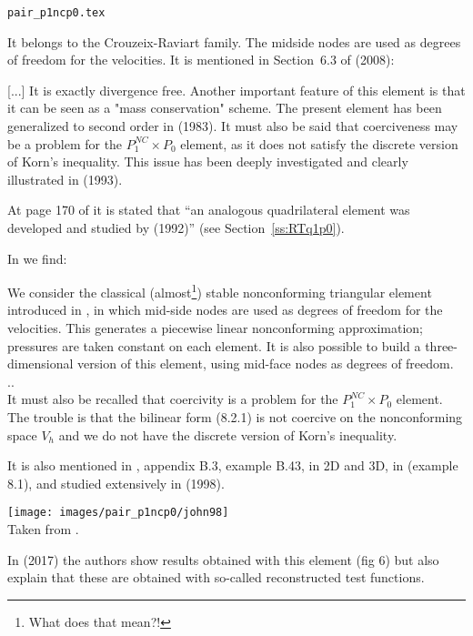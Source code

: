 \begin{flushright} {\tiny {\color{gray} \tt pair\_p1ncp0.tex}} \end{flushright}

It belongs to the Crouzeix-Raviart family. 
The midside nodes are used as degrees of freedom for the velocities.
It is mentioned in Section~6.3 of \textcite{bobf08} (2008): 
\begin{displayquote}
{\color{darkgray}
[...]
It is exactly divergence free. Another important feature of this
element is that it can be seen as a "mass conservation" scheme. The present element
has been generalized to second order in \textcite{foso83} (1983).
It must also be said that coerciveness may be a problem for the $P_1^{NC} \times P_0$ 
element, as it does not satisfy the discrete version of Korn's inequality. 
This issue has been deeply investigated and clearly illustrated in \textcite{arno93} (1993).}
\end{displayquote}



At page 170 of \cite{braess} it is stated that {\color{darkgray} ``an analogous quadrilateral element was 
developed and studied by \textcite{ratu92} (1992)''} (see Section~\ref{ss:RTq1p0}).

In \textcite{bobf13} we find: 
\begin{displayquote}
{\color{darkgray}
We consider the classical (almost\footnote{What does that mean?!}) 
stable nonconforming triangular 
element introduced in \textcite{crra73}, in which mid-side nodes are used as degrees of 
freedom for the velocities. This generates
a piecewise linear nonconforming approximation; pressures are taken constant on
each element. It is also possible to build a three-dimensional
version of this element, using mid-face nodes as degrees of freedom.
\\
..
\\
It must also be recalled that coercivity is a problem for the $P_1^{NC}\times P_0$ 
element. The trouble is that the bilinear form (8.2.1) is not coercive on the 
nonconforming space $V_h$ and we do not have the discrete version of Korn's inequality.}
\end{displayquote}


It is also mentioned in \textcite{john16}, appendix B.3, example B.43, in 2D and 3D, 
in \textcite{brfo} (example 8.1), and studied extensively in \textcite{john98} (1998). 

\begin{center}
\texttt{[image: images/pair\_p1ncp0/john98]}\\
{\captionfont Taken from \textcite{john98}.}
\end{center}

In \textcite{jolm17} (2017) the authors show results obtained with this element (fig 6) 
but also explain that these are obtained with so-called reconstructed test functions.
 
